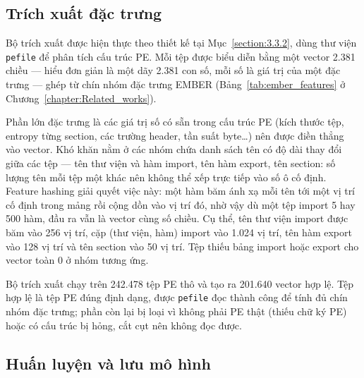 \documentclass[../DoAn.tex]{subfiles}
\begin{document}
\subsection{Trích xuất đặc trưng}
\label{section:4.2.2}

Bộ trích xuất được hiện thực theo thiết kế tại
Mục~\ref{section:3.3.2}, dùng thư viện \texttt{pefile} để phân tích
cấu trúc PE. Mỗi tệp được biểu diễn bằng một vector 2.381 chiều ---
hiểu đơn giản là một dãy 2.381 con số, mỗi số là giá trị của một đặc
trưng --- ghép từ chín nhóm đặc trưng EMBER
(Bảng~\ref{tab:ember_features} ở Chương~\ref{chapter:Related_works}).

Phần lớn đặc trưng là các giá trị số có sẵn trong cấu trúc PE (kích
thước tệp, entropy từng section, các trường header, tần suất byte\ldots)
nên được điền thẳng vào vector. Khó khăn nằm ở các nhóm chứa danh sách
tên có độ dài thay đổi giữa các tệp --- tên thư viện và hàm import, tên
hàm export, tên section: số lượng tên mỗi tệp một khác nên không thể
xếp trực tiếp vào số ô cố định. Feature hashing giải quyết việc này:
một hàm băm ánh xạ mỗi tên tới một vị trí cố định trong mảng rồi cộng
dồn vào vị trí đó, nhờ vậy dù một tệp import 5 hay 500 hàm, đầu ra vẫn
là vector cùng số chiều. Cụ thể, tên thư viện import được băm vào 256
vị trí, cặp (thư viện, hàm) import vào 1.024 vị trí, tên hàm export vào
128 vị trí và tên section vào 50 vị trí. Tệp thiếu bảng import hoặc
export cho vector toàn 0 ở nhóm tương ứng.

Bộ trích xuất chạy trên 242.478 tệp PE thô và tạo ra 201.640 vector
hợp lệ. Tệp hợp lệ là tệp PE đúng định dạng, được \texttt{pefile} đọc
thành công để tính đủ chín nhóm đặc trưng; phần còn lại bị loại vì
không phải PE thật (thiếu chữ ký PE) hoặc có cấu trúc bị hỏng, cắt cụt
nên không đọc được.
\subsection{Huấn luyện và lưu mô hình}
\label{section:4.2.3}
\end{document}
